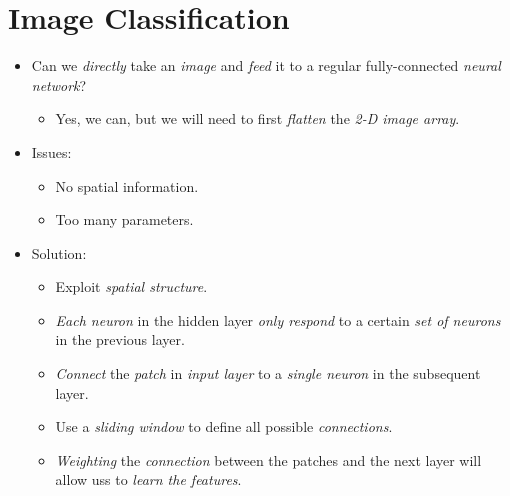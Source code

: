 \documentclass[
	number={9},
	title={Convolutional Neural Network}
]{cs584notes}
\begin{document}
\section{Image Classification}\label{sec:image-classification}
\begin{itemize}
	\item Can we \emph{directly} take an \emph{image} and \emph{feed} it to a regular fully-connected \emph{neural network}?
	\begin{itemize}
		\item Yes, we can, but we will need to first \emph{flatten} the \emph{2-D image array}.
	\end{itemize}
	\item Issues:
	\begin{itemize}
		\item No spatial information.
		\item Too many parameters.
	\end{itemize}
	\item Solution:
	\begin{itemize}
		\item Exploit \emph{spatial structure}.
		\item \emph{Each neuron} in the hidden layer \emph{only respond} to a certain \emph{set of neurons} in the previous layer.
		\item \emph{Connect} the \emph{patch} in \emph{input layer} to a \emph{single neuron} in the subsequent layer.
		\item Use a \emph{sliding window} to define all possible \emph{connections}.
		\item \emph{Weighting} the \emph{connection} between the patches and the next layer will allow uss to \emph{learn the features}.
	\end{itemize}
\end{itemize}
\end{document}
